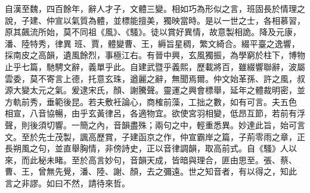 \begin{pinyinscope}
 自漢至魏，四百餘年，辭人才子，文體三變。相如巧為形似之言，班固長於情理之說，子建、仲宣以氣質為體，並標能擅美，獨映當時。是以一世之士，各相慕習，原其飆流所始，莫不同祖《風》、《騷》。徒以賞好異情，故意製相詭。降及元康，潘、陸特秀，律異
 班、賈，體變曹、王，縟旨星稠，繁文綺合。綴平臺之逸響，採南皮之高韻，遺風餘烈，事極江右。有晉中興，玄風獨振，為學窮於柱下，博物止乎七篇，馳騁文辭，義單乎此。自建武暨乎義熙，歷載將百，雖綴響聯辭，波屬雲委，莫不寄言上德，托意玄珠，遒麗之辭，無聞焉爾。仲文始革孫、許之風，叔源大變太元之氣。爰逮宋氏，顏、謝騰聲。靈運之興會標舉，延年之體裁明密，並方軌前秀，垂範後昆。若夫敷衽論心，商榷前藻，工拙之數，如有可言。夫五色
 相宣，八音協暢，由乎玄黃律呂，各適物宜。欲使宮羽相變，低昂互節，若前有浮聲，則後須切響。一簡之內，音韻盡殊；兩句之中，輕重悉異。妙達此旨，始可言文。至於先士茂製，諷高歷賞，子建函京之作，仲宣霸岸之篇，子荊零雨之章，正長朔風之句，並直舉胸情，非傍詩史，正以音律調韻，取高前式。自《騷》人以來，而此秘未睹。至於高言妙句，音韻天成，皆暗與理合，匪由思至。張、蔡、曹、王，曾無先覺，潘、陸、謝、顏，去之彌遠。世之知音者，有以得之，知此
 言之非謬。如曰不然，請待來哲。



\end{pinyinscope}